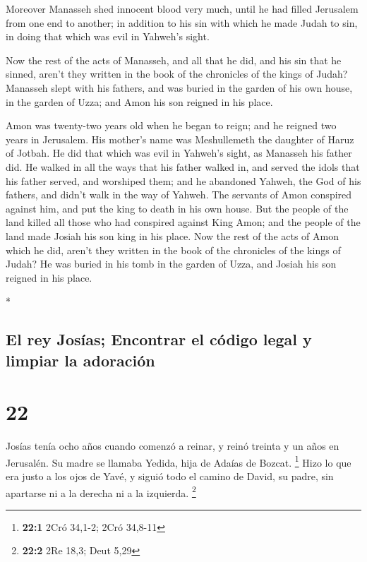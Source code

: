 \begin{paracol}{2}
\begin{otherlanguage}{english}
 Moreover Manasseh shed innocent blood very much, until
he had filled Jerusalem from one end to another; in addition to his sin
with which he made Judah to sin, in doing that which was evil in
Yahweh's sight.

 Now the rest of the acts of Manasseh, and all that he
did, and his sin that he sinned, aren't they written in the book of the
chronicles of the kings of Judah?  Manasseh slept with
his fathers, and was buried in the garden of his own house, in the
garden of Uzza; and Amon his son reigned in his place.

 Amon was twenty-two years old when he began to reign;
and he reigned two years in Jerusalem. His mother's name was
Meshullemeth the daughter of Haruz of Jotbah.  He did
that which was evil in Yahweh's sight, as Manasseh his father did.
 He walked in all the ways that his father walked in, and
served the idols that his father served, and worshiped them;
 and he abandoned Yahweh, the God of his fathers, and
didn't walk in the way of Yahweh.  The servants of Amon
conspired against him, and put the king to death in his own house.
 But the people of the land killed all those who had
conspired against King Amon; and the people of the land made Josiah his
son king in his place.  Now the rest of the acts of Amon
which he did, aren't they written in the book of the chronicles of the
kings of Judah?  He was buried in his tomb in the garden
of Uzza, and Josiah his son reigned in his place.

\end{otherlanguage}

\switchcolumn[0]*

\hypertarget{el-rey-josuxedas-encontrar-el-cuxf3digo-legal-y-limpiar-la-adoraciuxf3n}{%
\subsection{El rey Josías; Encontrar el código legal y limpiar la
adoración}\label{el-rey-josuxedas-encontrar-el-cuxf3digo-legal-y-limpiar-la-adoraciuxf3n}}

\hypertarget{section-42}{%
\section{22}\label{section-42}}

 Josías tenía ocho años cuando comenzó a reinar, y reinó
treinta y un años en Jerusalén. Su madre se llamaba Yedida, hija de
Adaías de Bozcat. \footnote{\textbf{22:1} 2Cró 34,1-2; 2Cró 34,8-11}
 Hizo lo que era justo a los ojos de Yavé, y siguió todo
el camino de David, su padre, sin apartarse ni a la derecha ni a la
izquierda. \footnote{\textbf{22:2} 2Re 18,3; Deut 5,29}


\end{paracol}
